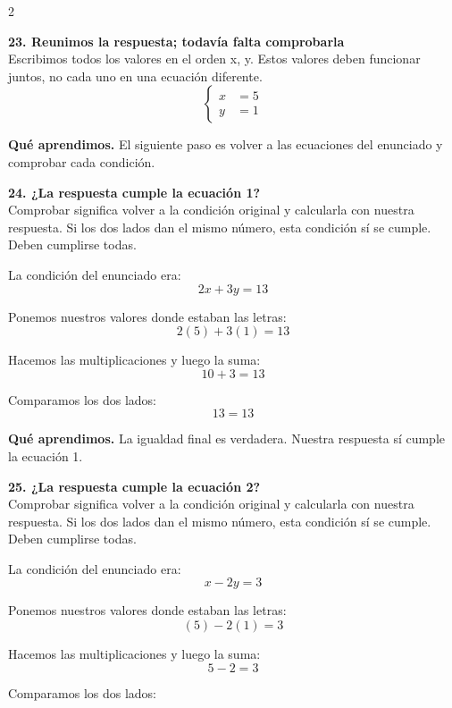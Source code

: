 \documentclass[11pt,a4paper,landscape]{article}
\begin{document}
\begin{multicols*}{2}
\noindent\begin{minipage}{\linewidth}\textbf{23. Reunimos la respuesta; todavía falta comprobarla}\\[2pt]Escribimos todos los valores en el orden x, y. Estos valores deben funcionar juntos, no cada uno en una ecuación diferente.
\[\left\{\begin{aligned}x&=5\\y&=1\end{aligned}\right.\]
\par\smallskip\textbf{Qué aprendimos.} El siguiente paso es volver a las ecuaciones del enunciado y comprobar cada condición.
\end{minipage}\par\medskip
\noindent\begin{minipage}{\linewidth}\textbf{24. ¿La respuesta cumple la ecuación 1?}\\[2pt]Comprobar significa volver a la condición original y calcularla con nuestra respuesta. Si los dos lados dan el mismo número, esta condición sí se cumple. Deben cumplirse todas.
\par\smallskip La condición del enunciado era:
\[2x + 3y = 13\]
\par\smallskip Ponemos nuestros valores donde estaban las letras:
\[2\left(5\right) + 3\left(1\right)=13\]
\par\smallskip Hacemos las multiplicaciones y luego la suma:
\[10 + 3=13\]
\par\smallskip Comparamos los dos lados:
\[13=13\]
\par\smallskip\textbf{Qué aprendimos.} La igualdad final es verdadera. Nuestra respuesta sí cumple la ecuación 1.
\end{minipage}\par\medskip
\noindent\begin{minipage}{\linewidth}\textbf{25. ¿La respuesta cumple la ecuación 2?}\\[2pt]Comprobar significa volver a la condición original y calcularla con nuestra respuesta. Si los dos lados dan el mismo número, esta condición sí se cumple. Deben cumplirse todas.
\par\smallskip La condición del enunciado era:
\[x - 2y = 3\]
\par\smallskip Ponemos nuestros valores donde estaban las letras:
\[\left(5\right) - 2\left(1\right)=3\]
\par\smallskip Hacemos las multiplicaciones y luego la suma:
\[5 - 2=3\]
\par\smallskip Comparamos los dos lados:

\end{minipage}
\end{multicols*}
\end{document}
